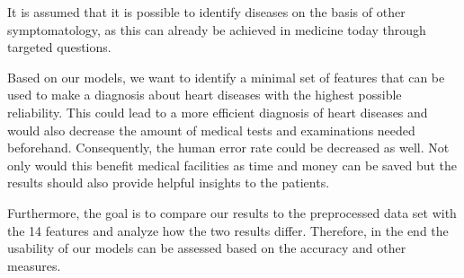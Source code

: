 \documentclass[11pt,titlepage,oneside,openany]{book}
\begin{document}
It is assumed that it is possible to identify diseases on the basis of other symptomatology, as this can already be achieved in medicine today through targeted questions. 

Based on our models, we want to identify a minimal set of features that can be used to make a diagnosis about heart diseases with the highest possible reliability. This could lead to a more efficient diagnosis of heart diseases and would also decrease the amount of medical tests and examinations needed beforehand. Consequently, the human error rate could be decreased as well. 
Not only would this benefit medical facilities as time and money can be saved but the results should also provide helpful insights to the patients.

Furthermore, the goal is to compare our results to the preprocessed data set with the 14 features and analyze how the two results differ. Therefore, in the end the usability of our models can be assessed based on the accuracy and other measures. 








\newpage


\pagestyle{empty}
\end{document}
